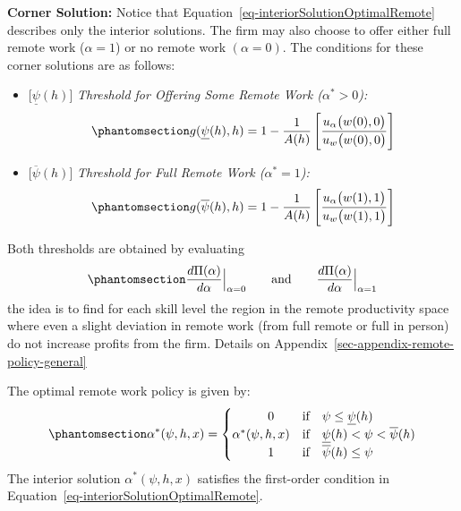 \documentclass[
  11pt,
  letterpaper,
  DIV=11,
  numbers=noendperiod]{scrartcl}
\providecommand{\tightlist}{%
  \setlength{\itemsep}{0pt}\setlength{\parskip}{0pt}}\usepackage{longtable,booktabs,array}
\theoremstyle{plain}
\theoremstyle{remark}
\begin{document}
\textbf{Corner Solution:} Notice that
Equation~\ref{eq-interiorSolutionOptimalRemote} describes only the
interior solutions. The firm may also choose to offer either full remote
work (\(\alpha = 1\)) or no remote work \((\alpha = 0)\). The conditions
for these corner solutions are as follows:

\begin{itemize}
\tightlist
\item
  {[}\(\underline{\psi}(h)\){]} \emph{Threshold for Offering Some Remote
  Work
  (\(\alpha^*>0\)):}\begin{equation}\phantomsection\label{eq-lower-threshold}{g(\underline{\psi}(h),h)=1-\frac{1}{A(h)}\left[\frac{u_\alpha\big(w(0),0\big)}{u_w\big(w(0),0\big)}\right]}\end{equation}
\item
  {[}\(\overline{\psi}(h)\){]} \emph{Threshold for Full Remote Work
  (\(\alpha^*=1\)):}\begin{equation}\phantomsection\label{eq-upper-threshold}{g(\overline{\psi}(h),h)=1-\frac{1}{A(h)}\left[\frac{u_\alpha\big(w(1),1\big)}{u_w\big(w(1),1\big)}\right]}\end{equation}
\end{itemize}

Both thresholds are obtained by evaluating
\begin{equation}\phantomsection\label{eq-thresholds-conditions-evaluatio}{\frac{d\Pi(\alpha)}{d\alpha}\Big|_{\alpha=0} \qquad \text{and} \qquad  \frac{d\Pi(\alpha)}{d\alpha}\Big|_{\alpha=1}}\end{equation}
the idea is to find for each skill level the region in the remote
productivity space where even a slight deviation in remote work (from
full remote or full in person) do not increase profits from the firm.
Details on Appendix~\ref{sec-appendix-remote-policy-general}

The optimal remote work policy is given by:
\begin{equation}\phantomsection\label{eq-optimalRemoteWorkPolicy}{\alpha^*(\psi, h, x) = \begin{cases}
    \hspace{1cm} 0 & \text{if} \quad \psi \leq \underline{\psi}(h) \\
    \alpha^*(\psi, h, x) &  \text{if} \quad \underline{\psi}(h) < \psi < \overline{\psi}(h) \\
    \hspace{1cm} 1 & \text{if} \quad \overline{\psi}(h) \leq \psi
\end{cases}}\end{equation} The interior solution
\(\alpha^*(\psi, h, x)\) satisfies the first-order condition in
Equation~\ref{eq-interiorSolutionOptimalRemote}.
\end{document}
